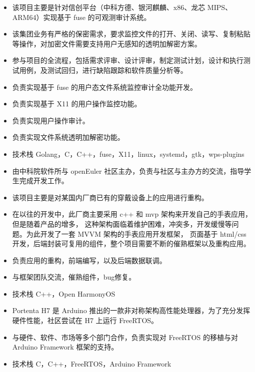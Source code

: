 \documentclass{resume}
\begin{document}
\begin{itemize}
  \item 该项目主要是针对信创平台（中科方德、银河麒麟、x86、龙芯 MIPS、ARM64）实现基于 fuse 的可观测审计系统。
  \item 该集团业务有严格的保密需求，要求监控文件的打开、关闭、读写、复制粘贴等操作，对加密文件需要支持用户无感知的透明加解密方案。
  \item 参与项目的全流程，包括需求评审、设计评审，制定测试计划，设计和执行测试用例，及测试回归，进行缺陷跟踪和软件质量分析等。
  \item 负责实现基于 fuse 的用户态文件系统监控审计全功能开发。
  \item 负责实现基于 X11 的用户操作监控功能。
  \item 负责实现用户操作审计。
  \item 负责实现文件系统透明加解密功能。
  \item 技术栈 Golang，C，C++，fuse，X11，linux，systemd，gtk，wps-plugins
\end{itemize}

\begin{itemize}
  \item 由中科院软件所与 openEuler 社区主办，负责与社区与主办方的交流，指导学生完成开发工作。
\end{itemize}

\begin{itemize}
  \item 该项目主要是对某国内厂商已有的穿戴设备上的应用进行重构。
  \item 在以往的开发中，此厂商主要采用 c++ 和 mvp 架构来开发自己的手表应用，但是随着产品的增多，
    这种架构面临着维护困难，冲突多，开发缓慢等问题。为此开发了一套 MVVM 架构的手表应用开发框架，
    页面基于 html/css 开发，后端封装可复用的组件，整个项目需要不断的催熟框架以及重构应用。
  \item 负责应用的重构，前端编写，以及后端数据联调。
  \item 与框架团队交流，催熟组件，bug修复。
  \item 技术栈 C++，Open HarmonyOS
\end{itemize}

\begin{itemize}
  \item Portenta H7 是 Arduino 推出的一款非对称架构高性能处理器，为了充分发挥硬件性能，社区尝试在 H7 上运行 FreeRTOS。
  \item 与硬件、软件、市场等多个部门合作，负责实现对 FreeRTOS 的移植与对 Arduino Framework 框架的支持。
  \item 技术栈 C，C++，FreeRTOS，Arduino Framework
\end{itemize}
\end{document}

